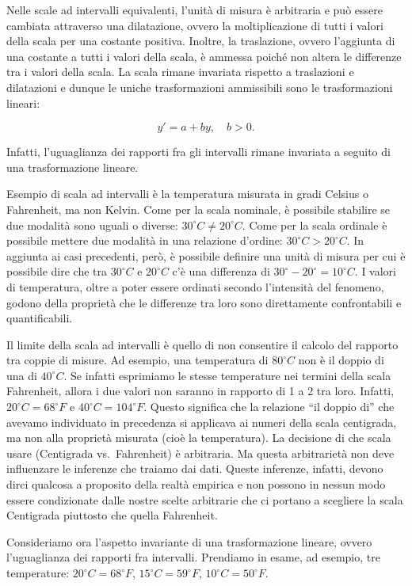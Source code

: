 \documentclass[
  letterpaper,
]{krantz}
\begin{document}
Nelle scale ad intervalli equivalenti, l'unità di misura è arbitraria e
può essere cambiata attraverso una dilatazione, ovvero la
moltiplicazione di tutti i valori della scala per una costante positiva.
Inoltre, la traslazione, ovvero l'aggiunta di una costante a tutti i
valori della scala, è ammessa poiché non altera le differenze tra i
valori della scala. La scala rimane invariata rispetto a traslazioni e
dilatazioni e dunque le uniche trasformazioni ammissibili sono le
trasformazioni lineari:

\[
y' = a + by, \quad b > 0.
\]

Infatti, l'uguaglianza dei rapporti fra gli intervalli rimane invariata
a seguito di una trasformazione lineare.

Esempio di scala ad intervalli è la temperatura misurata in gradi
Celsius o Fahrenheit, ma non Kelvin. Come per la scala nominale, è
possibile stabilire se due modalità sono uguali o diverse:
\(30^\circ C \neq 20^\circ C\). Come per la scala ordinale è possibile
mettere due modalità in una relazione d'ordine:
\(30^\circ C > 20^\circ C\). In aggiunta ai casi precedenti, però, è
possibile definire una unità di misura per cui è possibile dire che tra
\(30^\circ C\) e \(20^\circ C\) c'è una differenza di
\(30^\circ - 20^\circ = 10^\circ C\). I valori di temperatura, oltre a
poter essere ordinati secondo l'intensità del fenomeno, godono della
proprietà che le differenze tra loro sono direttamente confrontabili e
quantificabili.

Il limite della scala ad intervalli è quello di non consentire il
calcolo del rapporto tra coppie di misure. Ad esempio, una temperatura
di \(80^\circ C\) non è il doppio di una di \(40^\circ C\). Se infatti
esprimiamo le stesse temperature nei termini della scala Fahrenheit,
allora i due valori non saranno in rapporto di 1 a 2 tra loro. Infatti,
\(20^\circ C = 68^\circ F\) e \(40^\circ C = 104^\circ F\). Questo
significa che la relazione ``il doppio di'' che avevamo individuato in
precedenza si applicava ai numeri della scala centigrada, ma non alla
proprietà misurata (cioè la temperatura). La decisione di che scala
usare (Centigrada vs.~Fahrenheit) è arbitraria. Ma questa arbitrarietà
non deve influenzare le inferenze che traiamo dai dati. Queste
inferenze, infatti, devono dirci qualcosa a proposito della realtà
empirica e non possono in nessun modo essere condizionate dalle nostre
scelte arbitrarie che ci portano a scegliere la scala Centigrada
piuttosto che quella Fahrenheit.

Consideriamo ora l'aspetto invariante di una trasformazione lineare,
ovvero l'uguaglianza dei rapporti fra intervalli. Prendiamo in esame, ad
esempio, tre temperature: \(20^\circ C = 68^\circ F\),
\(15^\circ C = 59^\circ F\), \(10^\circ C = 50 ^\circ F\).
\end{document}
